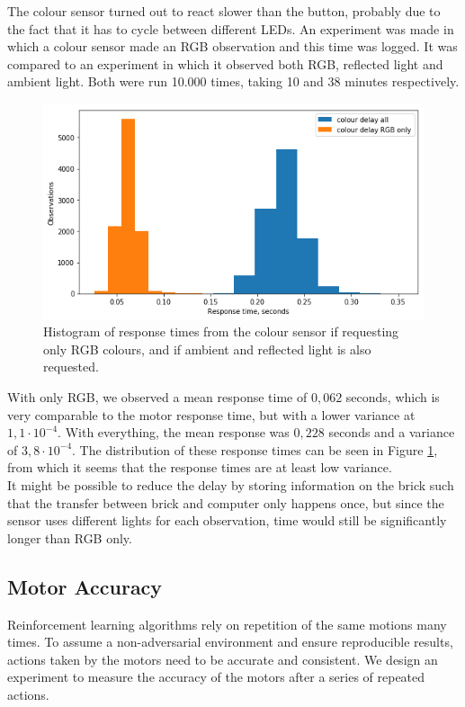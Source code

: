 \documentclass[11pt, a4paper]{article}
\begin{document}
The colour sensor turned out to react slower than the button, probably due to the fact that it has to cycle between different LEDs. An experiment was made in which a colour sensor made an RGB observation and this time was logged. It was compared to an experiment in which it observed both RGB, reflected light and ambient light. Both were run 10.000 times, taking 10 and 38 minutes respectively. \\
\begin{figure}[H]
	\centering
	\includegraphics[scale=0.7]{images/colour_response_histogram.png} 	
	\caption{Histogram of  response times from the colour sensor if requesting only RGB colours, and if ambient and reflected light is also requested.}
	\label{fig:responsetimecolour}
\end{figure}
With only RGB, we observed a mean response time of $0,062$ seconds, which is very comparable to the motor response time, but with a lower variance at $1,1\cdot 10^{-4}$. With everything, the mean response was $0,228$ seconds and a variance of $3,8 \cdot 10^{-4}$. The distribution of these response times can be seen in Figure \ref{fig:responsetimecolour}, from which it seems that the response times are at least low variance. \\
It might be possible to reduce the delay by storing information on the brick such that the transfer between brick and computer only happens once, but since the sensor uses different lights for each observation, time would still be significantly longer than RGB only.


\subsection{Motor Accuracy}
Reinforcement learning algorithms rely on repetition of the same motions many times. To assume a non-adversarial environment and ensure reproducible results, actions taken by the motors need to be accurate and consistent. We design an experiment to measure the accuracy of the motors after a series of repeated actions.
\end{document}
